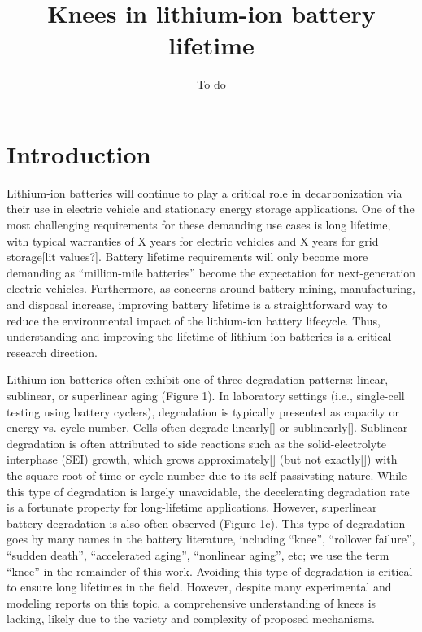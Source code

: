 \documentclass{article}
\title{Knees in lithium-ion battery lifetime}
\author{To do}
\date{}
\begin{document}
\maketitle

\section{Introduction}

Lithium-ion batteries will continue to play a critical role in decarbonization via their use in electric vehicle and stationary energy storage applications. One of the most challenging requirements for these demanding use cases is long lifetime, with typical warranties of X years for electric vehicles and X years for grid storage[lit values?]. Battery lifetime requirements will only become more demanding as “million-mile batteries” become the expectation for next-generation electric vehicles. Furthermore, as concerns around battery mining, manufacturing, and disposal increase, improving battery lifetime is a straightforward way to reduce the environmental impact of the lithium-ion battery lifecycle. Thus, understanding and improving the lifetime of lithium-ion batteries is a critical research direction.

Lithium ion batteries often exhibit one of three degradation patterns: linear, sublinear, or superlinear aging (Figure 1). In laboratory settings (i.e., single-cell testing using battery cyclers), degradation is typically presented as capacity or energy vs. cycle number. Cells often degrade linearly[] or sublinearly[]. Sublinear degradation is often attributed to side reactions such as the solid-electrolyte interphase (SEI) growth, which grows approximately[] (but not exactly[]) with the square root of time or cycle number due to its self-passivsting nature. While this type of degradation is largely unavoidable, the decelerating degradation rate is a fortunate property for long-lifetime applications. However, superlinear battery degradation is also often observed (Figure 1c). This type of degradation goes by many names in the battery literature, including “knee”, “rollover failure”, “sudden death”, “accelerated aging”, “nonlinear aging”, etc; we use the term “knee” in the remainder of this work. Avoiding this type of degradation is critical to ensure long lifetimes in the field. However, despite many experimental and modeling reports on this topic, a comprehensive understanding of knees is lacking, likely due to the variety and complexity of proposed mechanisms.
\end{document}
